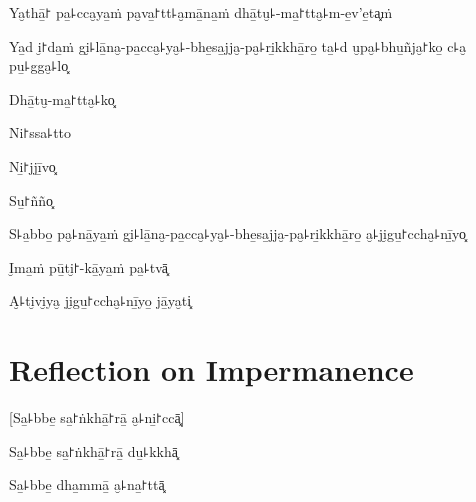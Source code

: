 Ya̮thā̱꜓ pa̱꜕cca̮ya̱ṁ pa̮va̱꜓tt꜕a̮mā̱na̱ṁ dhā̱tu̮꜕-ma̱꜓tta̮꜕m-e̱v'e̱ta͓ṁ


Ya̱d i̮꜓da̱ṁ gi̮꜕lā̱na̮-pa̱cca̮꜕ya̮꜕-bhe̱sa̱jja̮-pa̮꜕ri̱kkhā̱ro̱ ta̱꜕d u̮pa̮꜕bhu̱ñja̮꜓ko̱ c꜕a̮ pu̱꜕gga̮꜕lo͓


Dhā̱tu̮-ma̱꜓tta̮꜕ko͓


Ni꜓ssa꜕tto


Ni̱꜓jjī̱vo͓


Su̱꜓ñño͓


S꜕a̱bbo̱ pa̮꜕nā̱ya̱ṁ gi̮꜕lā̱na̮-pa̱cca̮꜕ya̮꜕-bhe̱sa̱jja̮-pa̮꜕ri̱kkhā̱ro̱ a̮꜕ji̮gu̱꜓ccha̮꜕nī̱yo͓


I̮ma̱ṁ pū̱ti̮꜓-kā̱ya̱ṁ pa̱꜕tvā͓


A̮꜕ti̮vi̮ya̮ ji̮gu̱꜓ccha̮꜕nī̱yo̱ jā̱ya̮ti͓


\artopttrue

\chapter{Reflection on Impermanence}


\begin{leader}
\end{leader}

[Sa̱꜕bbe̱ sa̱꜓ṅkhā̱꜓rā̱ a̮꜕ni̱꜓ccā͓]


Sa̱꜕bbe̱ sa̱꜓ṅkhā̱꜓rā̱ du̱꜕kkhā͓


Sa̱꜕bbe̱ dha̱mmā̱ a̮꜕na̱꜓ttā͓


